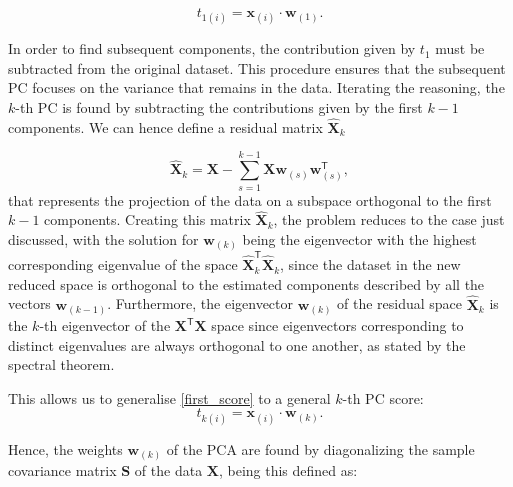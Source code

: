 \begin{equation}
t_{1(i)} = \mathbf{x}_{(i)} \cdot \mathbf{w}_{(1)}.\label{first_score}
\end{equation}

In order to find subsequent components, the contribution given by $t_{1}$ must be subtracted from the original dataset. This procedure ensures that the subsequent PC focuses on the variance that remains in the data. Iterating the reasoning, the $k$-th PC is found by subtracting the contributions given by the first $k-1$ components. We can hence define a residual matrix $\mathbf{\hat{X}}_{k}$

\begin{equation}
\mathbf{\hat{X}}_{k} = \mathbf{X} - \sum_{s=1}^{k-1} \mathbf{X} \mathbf{w}_{(s)} \mathbf{w}_{(s)}^{\mathsf{T}},\label{dim_red_tran}
\end{equation}
that represents the projection of the data on a subspace orthogonal to the first $k-1$ components.
Creating this matrix $\mathbf{\hat{X}}_{k}$, the problem reduces to the case just discussed, with the solution for $\mathbf{w}_{(k)}$ being the eigenvector with the highest corresponding eigenvalue of the space $\mathbf{\hat{X}}_{k}^\mathsf{T}\mathbf{\hat{X}}_{k}$, since the dataset in the new reduced space is orthogonal to the estimated components described by all the vectors $\mathbf{w}_{(k-1)}$. Furthermore, the eigenvector $\mathbf{w}_{(k)}$ of the residual space $\mathbf{\hat{X}}_{k}$ is the $k$-th  eigenvector of the $\mathbf{X}^{\mathsf{T}} \mathbf{X}$ space since eigenvectors corresponding to distinct eigenvalues are always orthogonal to one another, as stated by the spectral theorem.

This allows us to generalise \eqref{first_score} to a general $k$-th PC score:
\begin{equation}
t_{k(i)} = \mathbf{x}_{(i)} \cdot \mathbf{w}_{(k)}.\label{score}
\end{equation}





Hence, the weights $\mathbf{w}_{(k)}$ of the PCA are found by diagonalizing the sample covariance matrix $\mathbf{S}$ of the data $\mathbf{X}$, being this defined as:

